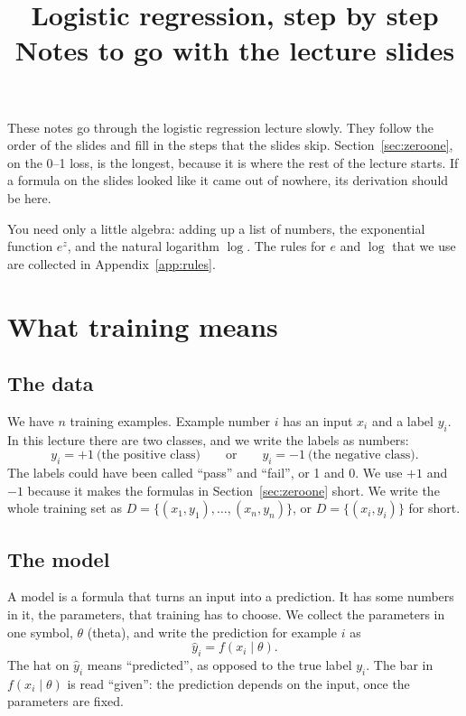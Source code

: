 \documentclass[11pt]{article}
\title{Logistic regression, step by step\\[0.3em]\large Notes to go with the lecture slides}
\author{}
\date{}
\begin{document}
\maketitle

These notes go through the logistic regression lecture slowly. They follow the order of the slides
and fill in the steps that the slides skip. Section~\ref{sec:zeroone}, on the 0--1 loss, is the
longest, because it is where the rest of the lecture starts. If a formula on the slides looked like
it came out of nowhere, its derivation should be here.

You need only a little algebra: adding up a list of numbers, the exponential function $e^z$, and the
natural logarithm $\log$. The rules for $e$ and $\log$ that we use are collected in
Appendix~\ref{app:rules}.

\tableofcontents

\section{What training means}

\subsection*{The data}

We have $n$ training examples. Example number $i$ has an input $x_i$ and a label $y_i$. In this
lecture there are two classes, and we write the labels as numbers:
\[
  y_i = +1 \ \text{(the positive class)} \qquad\text{or}\qquad y_i = -1 \ \text{(the negative class)}.
\]
The labels could have been called ``pass'' and ``fail'', or 1 and 0. We use $+1$ and $-1$ because it
makes the formulas in Section~\ref{sec:zeroone} short. We write the whole training set as
$D = \{(x_1, y_1), \dots, (x_n, y_n)\}$, or $D = \{(x_i, y_i)\}$ for short.

\subsection*{The model}

A model is a formula that turns an input into a prediction. It has some numbers in it, the
parameters, that training has to choose. We collect the parameters in one symbol, $\theta$ (theta),
and write the prediction for example $i$ as
\[
  \hat y_i = f(x_i \mid \theta).
\]
The hat on $\hat y_i$ means ``predicted'', as opposed to the true label $y_i$. The bar in
$f(x_i \mid \theta)$ is read ``given'': the prediction depends on the input, once the parameters are
fixed.
\end{document}
